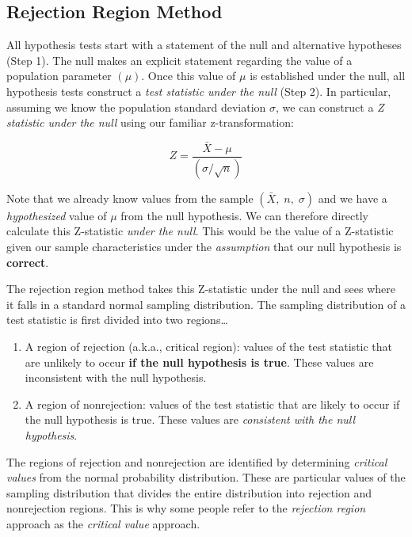 \documentclass[
]{book}
\begin{document}
\hypertarget{rejection-region-method}{%
\subsection{Rejection Region Method}\label{rejection-region-method}}

All hypothesis tests start with a statement of the null and alternative hypotheses (Step 1). The null makes an explicit statement regarding the value of a population parameter \((\mu)\). Once this value of \(\mu\) is established under the null, all hypothesis tests construct a \emph{test statistic under the null} (Step 2). In particular, assuming we know the population standard deviation \(\sigma\), we can construct a \emph{Z statistic under the null} using our familiar z-transformation:

\[Z = \frac{\bar{X}-\mu}{\left(\sigma / \sqrt{n} \right)}\]

Note that we already know values from the sample \((\bar{X},\;n,\;\sigma)\) and we have a \emph{hypothesized} value of \(\mu\) from the null hypothesis. We can therefore directly calculate this Z-statistic \emph{under the null}. This would be the value of a Z-statistic given our sample characteristics under the \emph{assumption} that our null hypothesis is \textbf{correct}.

The rejection region method takes this Z-statistic under the null and sees where it falls in a standard normal sampling distribution. The sampling distribution of a test statistic is first divided into two regions\ldots{}

\begin{enumerate}
\def\labelenumi{\arabic{enumi}.}
\item
  A region of rejection (a.k.a., critical region): values of the test statistic that are unlikely to occur \textbf{if the null hypothesis is true}. These values are inconsistent with the null hypothesis.
\item
  A region of nonrejection: values of the test statistic that are likely to occur if the null hypothesis is true. These values are \emph{consistent with the null hypothesis}.
\end{enumerate}

The regions of rejection and nonrejection are identified by determining \emph{critical values} from the normal probability distribution. These are particular values of the sampling distribution that divides the entire distribution into rejection and nonrejection regions. This is why some people refer to the \emph{rejection region} approach as the \emph{critical value} approach.
\end{document}
